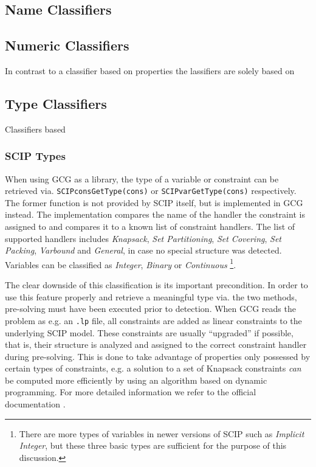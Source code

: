 		\subsection{Name Classifiers}
		
			
		
		\subsection{Numeric Classifiers}
		
			In contrast to a classifier based on properties the  lassifiers are solely based on 
		
			\clearpage
		
		\subsection{Type Classifiers}
		
			Classifiers based 
			
			\subsubsection{SCIP Types}
			
				When using \ac{GCG} as a library, the type of a variable or constraint can be retrieved via. \lstinline|SCIPconsGetType(cons)| or \lstinline|SCIPvarGetType(cons)| respectively.
				The former function is not provided by \ac{SCIP} itself, but is implemented in \ac{GCG} instead.
				The implementation compares the name of the handler the constraint is assigned to and compares it to a known list of constraint handlers. 
				The list of supported handlers includes \emph{Knapsack}, \emph{Set Partitioning}, \emph{Set Covering}, \emph{Set Packing}, \emph{Varbound} and \emph{General}, in case no special structure was detected. 
				Variables can be classified as \emph{Integer}, \emph{Binary} or \emph{Continuous}
				\footnote{There are more types of variables in newer versions of \ac{SCIP} such as \emph{Implicit Integer}, but these three basic types are sufficient for the purpose of this discussion.}.
				
				The clear downside of this classification is its important precondition.
				In order to use this feature properly and retrieve a meaningful type via. the two methods, pre-solving must have been executed prior to detection.
				When \ac{GCG} reads the problem as e.g. an \lstinline|.lp| file, all constraints are added as linear constraints to the underlying \ac{SCIP} model.
				These constraints are usually \enquote{upgraded} if possible, that is, their structure is analyzed and assigned to the correct constraint handler during pre-solving.
				This is done to take advantage of properties only possessed by certain types of constraints, e.g. a solution to a set of Knapsack constraints \textit{can} be computed more efficiently by using an algorithm based on dynamic programming.
				For more detailed information we refer to the official documentation \cite{SCIPDoxygenDocumentation}.
				
